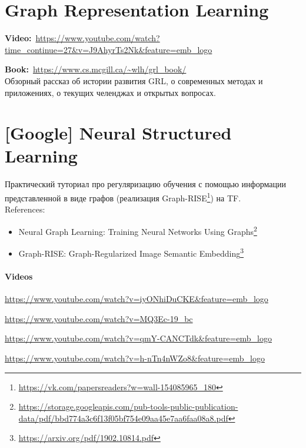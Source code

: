 
\section{Graph Representation Learning}

\textbf{Video:}~\url{https://www.youtube.com/watch?time_continue=27&v=J9AhyrTs2Nk&feature=emb_logo}

\textbf{Book:}~\url{https://www.cs.mcgill.ca/~wlh/grl_book/} \\

Обзорный рассказ об истории развития GRL, о современных методах и приложениях, о текущих челенджах и открытых вопросах.


\section{[Google] Neural Structured Learning} 

Практический туториал про регуляризацию обучения с помощью информации представленной в виде графов (реализация Graph-RISE\footnote{\url{https://vk.com/papersreaders?w=wall-154085965_180}}) на TF. \\

References:

\begin{itemize}
    \item Neural Graph Learning: Training Neural Networks Using Graphs\footnote{\url{https://storage.googleapis.com/pub-tools-public-publication-data/pdf/bbd774a3c6f13f05bf754e09aa45e7aa6faa08a8.pdf}}
	\item Graph-RISE: Graph-Regularized Image Semantic Embedding\footnote{\url{https://arxiv.org/pdf/1902.10814.pdf}}
\end{itemize}

\paragraph{Videos}

\url{https://www.youtube.com/watch?v=iyONhiDuCKE&feature=emb_logo}

\url{https://www.youtube.com/watch?v=MQ3Ec-19_bc}

\url{https://www.youtube.com/watch?v=qmY-CANCTdk&feature=emb_logo}

\url{https://www.youtube.com/watch?v=h-nTn4nWZo8&feature=emb_logo}

